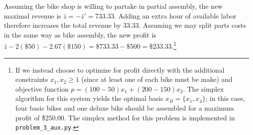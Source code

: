 \begin{solution}
  Assuming the bike shop is willing to partake in partial assembly, the new maximal revenue is 
  $\bar{z} = -\bar{z}' = 733.33$. Adding an extra hour of available labor therefore increases the total revenue by 
  $33.33$. Assuming we may split parts costs in the same way as bike assembly, the new profit is 
  $\bar{z} - 2(\$50) - 2.67(\$150) = \$733.33 - \$500 = \$233.33$.\footnote{
    If we instead choose to optimize for profit directly with the additional constraints $x_1, x_2 \ge 1$ (since at 
    least one of each bike must be make) and objective function $p = (100 - 50)x_1 + (200 - 150)x_2$. The simplex 
    algorithm for this system yields the optimal basis $x_B = \{ x_1, x_4 \}$; in this case, four basic bikes and one 
    deluxe bike should be assembled for a maximum profit of \$250.00. The simplex method for this problem is implemented
    in \texttt{problem\_3\_aux.py}.
  }

\end{solution}
